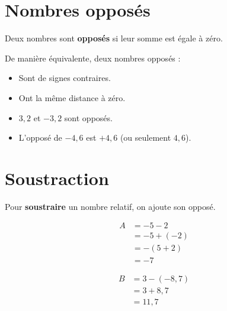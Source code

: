 \documentclass[../€Cours-complet/Cours-complet]{subfiles}
\begin{document}
\section{Nombres opposés}

\begin{cours}
	Deux nombres sont \textbf{opposés} si leur somme est égale à zéro.

	De manière équivalente, deux nombres opposés :
	\begin{itemize}
		\item Sont de signes contraires.
		\item Ont la même distance à zéro.
	\end{itemize}
\end{cours}

\begin{exemple}
	\begin{itemize}
		\item $3,2$ et $-3,2$ sont opposés.
		\item L'opposé de $-4,6$ est $+4,6$ (ou seulement $4,6$).
	\end{itemize}
\end{exemple}

\section{Soustraction}

\begin{cours}
	Pour \textbf{soustraire} un nombre relatif, on ajoute son opposé.
\end{cours}

\begin{exemple}
	\begin{minipage}{0.45\textwidth}
		\begin{align*}
			A & = -5 - 2    \\
			  & = -5 + (-2) \\
			  & = -(5 + 2)  \\
			  & = -7
		\end{align*}
	\end{minipage}
	\begin{minipage}{0.45\textwidth}
		\begin{align*}
			B & = 3 - (-8,7) \\
			  & = 3 + 8,7    \\
			  & = 11,7
		\end{align*}
	\end{minipage}
\end{exemple}
\end{document}
